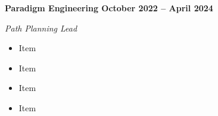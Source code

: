 \vspace{0.1cm}
\textbf{Paradigm Engineering \hfill October 2022 -- April 2024} \par
\textit{Path Planning Lead} \par
\begin{itemize}
	\item Item
  \item Item
  \item Item
  \item Item
\end{itemize} \par